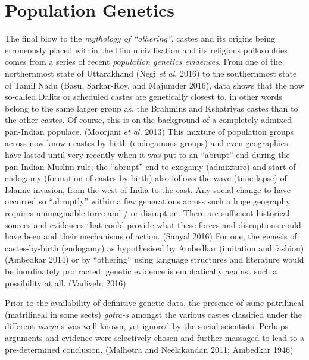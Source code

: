 
\section*{Population Genetics}

The final blow to the \textit{mythology of “othering”}, castes and its origins being erroneously placed within the Hindu civilisation and its religious philosophies comes from a series of recent \textit{population genetics evidences}. From one of the northernmost state of Uttarakhand (Negi \textit{et al}. 2016) to the southernmost state of Tamil Nadu (Basu, Sarkar-Roy, and Majumder 2016), data shows that the now so-called Dalits or scheduled castes are genetically closest to, in other words belong to the same larger group as, the Brahmins and Kshatriyas castes than to the other castes. Of course, this is on the background of a completely admixed pan-Indian populace. (Moorjani \textit{et al.} 2013) This mixture of population groups across now known castes-by-birth (endogamous groups) and even geographies have lasted until very recently when it was put to an “abrupt” end during the pan-Indian Muslim rule; the “abrupt” end to exogamy (admixture) and start of endogamy (formation of castes-by-birth) also follows the wave (time lapse) of Islamic invasion, from the west of India to the east. Any social change to have occurred so “abruptly” within a few generations across such a huge geography requires unimaginable force and / or disruption. There are sufficient historical sources and evidences that could provide what these forces and disruptions could have been and their mechanisms of action. (Sanyal 2016) For one, the genesis of castes-by-birth (endogamy) as hypothesised by Ambedkar (imitation and fashion) (Ambedkar 2014) or by “othering” using language structures and literature would be inordinately protracted: genetic evidence is emphatically against such a possibility at all. (Vadivelu 2016)

\vspace{.1cm}

Prior to the availability of definitive genetic data, the presence of same patrilineal (matrilineal in some sects) \textit{gotra-s} amongst the various castes classified under the different \textit{varṇa}-s was well known, yet ignored by the social scientists. Perhaps arguments and evidence were selectively chosen and further massaged to lead to a pre-determined conclusion. (Malhotra and Neelakandan 2011; Ambedkar 1946)

